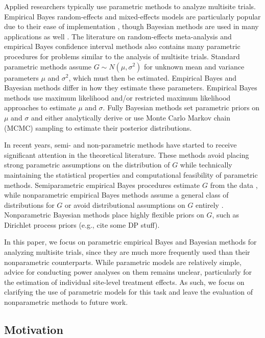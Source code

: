 \documentclass[]{article}
\begin{document}
Applied researchers typically use parametric methods to analyze multisite trials.
Empirical Bayes random-effects and mixed-effects models are particularly popular due to their ease of implementation \citep{bloom2017using}, though Bayesian methods are used in many applications as well \citep{rubin1981estimation}.
The literature on random-effects meta-analysis \citep{higgins2009re} and empirical Bayes confidence interval methods \citep{morris1983parametric, he1992parametric, gene2009empirical} also contains many parametric procedures for problems similar to the analysis of multisite trials.
Standard parametric methods assume $G \sim N(\mu, \sigma^2)$ for unknown mean and variance parameters $\mu$ and $\sigma^2$, which must then be estimated.
Empirical Bayes and Bayesian methods differ in how they estimate these parameters.
Empirical Bayes methods use maximum likelihood and/or restricted maximum likelihood approaches to estimate $\mu$ and $\sigma$.
Fully Bayesian methods set parametric priors on $\mu$ and $\sigma$ and either analytically derive or use Monte Carlo Markov chain (MCMC) sampling to estimate their posterior distributions.

In recent years, semi- and non-parametric methods have started to receive significant attention in the theoretical literature.
These methods avoid placing strong parametric assumptions on the distribution of $G$ while technically maintaining the statistical properties and computational feasibility of parametric methods.
Semiparametric empirical Bayes procedures estimate $G$ from the data \citep{laird1987empirical, yu2018adaptive}, while nonparametric empirical Bayes methods assume a general class of distributions for $G$ \citep{ignatiadis2022confidence} or avoid distributional assumptions on $G$ entirely \citep{armstrong2020robust}.
Nonparametric Bayesian methods place highly flexible priors on $G$, such as Dirichlet process priors (e.g., cite some DP stuff).

In this paper, we focus on parametric empirical Bayes and Bayesian methods for analyzing multisite trials, since they are much more frequently used than their nonparametric counterparts.
While parametric models are relatively simple, advice for conducting power analyses on them remains unclear, particularly for the estimation of individual site-level treatment effects.
As such, we focus on clarifying the use of parametric models for this task and leave the evaluation of nonparametric methods to future work.

\subsection{Motivation}
\end{document}
